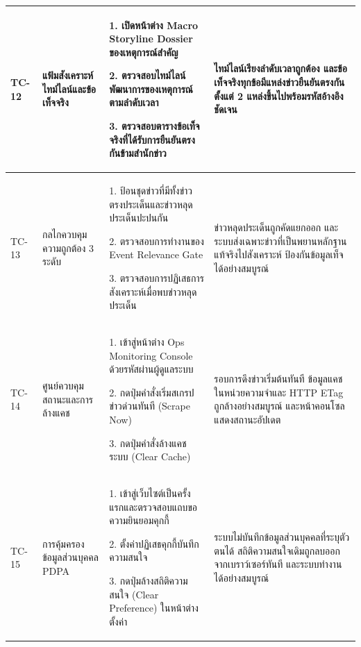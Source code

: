 \begin{longtable}{|C{1.1cm}|L{2.7cm}|L{4.5cm}|L{4.5cm}|}
TC-12 & แฟ้มสังเคราะห์ไทม์ไลน์และข้อเท็จจริง & 1. เปิดหน้าต่าง Macro Storyline Dossier ของเหตุการณ์สำคัญ\par  2. ตรวจสอบไทม์ไลน์พัฒนาการของเหตุการณ์ตามลำดับเวลา\par  3. ตรวจสอบตารางข้อเท็จจริงที่ได้รับการยืนยันตรงกันข้ามสำนักข่าว & ไทม์ไลน์เรียงลำดับเวลาถูกต้อง และข้อเท็จจริงทุกข้อมีแหล่งข่าวยืนยันตรงกันตั้งแต่ 2 แหล่งขึ้นไปพร้อมรหัสอ้างอิงชัดเจน \\ \hline
TC-13 & กลไกควบคุมความถูกต้อง 3 ระดับ & 1. ป้อนชุดข่าวที่มีทั้งข่าวตรงประเด็นและข่าวหลุดประเด็นปะปนกัน\par  2. ตรวจสอบการทำงานของ Event Relevance Gate\par  3. ตรวจสอบการปฏิเสธการสังเคราะห์เมื่อพบข่าวหลุดประเด็น & ข่าวหลุดประเด็นถูกคัดแยกออก และระบบส่งเฉพาะข่าวที่เป็นพยานหลักฐานแท้จริงไปสังเคราะห์ ป้องกันข้อมูลเท็จได้อย่างสมบูรณ์ \\ \hline
TC-14 & ศูนย์ควบคุมสถานะและการล้างแคช & 1. เข้าสู่หน้าต่าง Ops Monitoring Console ด้วยรหัสผ่านผู้ดูแลระบบ\par  2. กดปุ่มคำสั่งเริ่มสเกรปข่าวด่วนทันที (Scrape Now)\par  3. กดปุ่มคำสั่งล้างแคชระบบ (Clear Cache) & รอบการดึงข่าวเริ่มต้นทันที ข้อมูลแคชในหน่วยความจำและ HTTP ETag ถูกล้างอย่างสมบูรณ์ และหน้าคอนโซลแสดงสถานะอัปเดต \\ \hline
TC-15 & การคุ้มครองข้อมูลส่วนบุคคล PDPA & 1. เข้าสู่เว็บไซต์เป็นครั้งแรกและตรวจสอบแถบขอความยินยอมคุกกี้\par  2. ตั้งค่าปฏิเสธคุกกี้บันทึกความสนใจ\par  3. กดปุ่มล้างสถิติความสนใจ (Clear Preference) ในหน้าต่างตั้งค่า & ระบบไม่บันทึกข้อมูลส่วนบุคคลที่ระบุตัวตนได้ สถิติความสนใจเดิมถูกลบออกจากเบราว์เซอร์ทันที และระบบทำงานได้อย่างสมบูรณ์ \\
\hline
\end{longtable}
